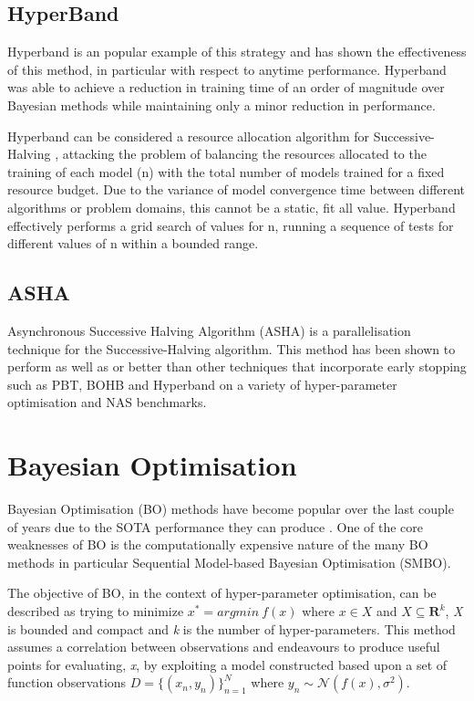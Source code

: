 \documentclass{article}
\begin{document}
	\subsection{HyperBand}

		Hyperband \cite{48} is an popular example of this strategy and has shown the effectiveness of this method, in particular with respect to anytime performance. Hyperband was able to achieve a reduction in training time of an order of magnitude over Bayesian methods while maintaining only a minor reduction in performance.

		Hyperband can be considered a resource allocation algorithm for Successive-Halving \cite{45}, attacking the problem of balancing the resources allocated to the training of each model (n) with the total number of models trained for a fixed resource budget. Due to the variance of model convergence time between different algorithms or problem domains, this cannot be a static, fit all value. Hyperband effectively performs a grid search of values for n, running a sequence of tests for different values of n within a bounded range.


	\subsection{ASHA}

		Asynchronous Successive Halving Algorithm (ASHA) \cite{34} is a parallelisation technique for the Successive-Halving algorithm. This method has been shown to perform as well as or better than other techniques that incorporate early stopping such as PBT, BOHB and Hyperband on a variety of hyper-parameter optimisation and NAS benchmarks.




\section {Bayesian Optimisation}

	Bayesian Optimisation (BO) methods have become popular over the last couple of years due to the SOTA performance they can produce \cite{32} \cite{20}. One of the core weaknesses of BO is the computationally expensive nature of the many BO methods in particular Sequential Model-based Bayesian Optimisation (SMBO). 

	\par

	The objective of BO, in the context of hyper-parameter optimisation, can be described as trying to minimize \(x^* = argmin~ f(x)\) where \(x \in X\) and \(X \subseteq \mathbf{R} ^k\), \textit{X} is bounded and compact and \textit{k} is the number of hyper-parameters. This method assumes a correlation between observations and endeavours to produce useful points for evaluating, \textit{x}, by exploiting a model constructed based upon a set of function observations \( D = \{(x_n,y_n)\}_{n=1}^N\) where \(y_n \sim \mathcal{N}(f(x), \sigma^2) \).
\end{document}
